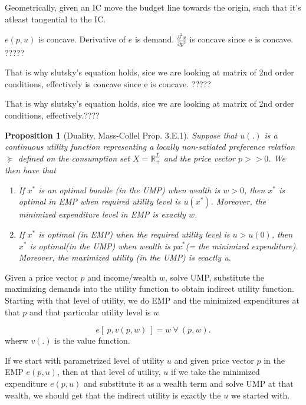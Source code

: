 \documentclass{tufte-handout}
\newtheorem{prop}{Proposition}
\begin{document}
Geometrically, given an IC move the budget line towards the origin, such that it's atleast tangential to the IC.

$e(p,u)$ is concave. Derivative of  $e$ is demand.  $\frac{\partial^2 x}{\partial p^2}$ is concave since e is concave. ?????

That is why slutsky's equation holds, sice we are looking at matrix of 2nd order conditions, effectively is concave since e is concave. ?????

That is why slutsky's equation holds, sice we are looking at matrix of 2nd order conditions, effectively.????






\begin{prop}[Duality, Mass-Collel Prop. 3.E.1]
		Suppose that $u(.)$ is a continuous utility function representing a locally non-satiated preference relation $\succeq$ defined on the consumption set  $X = \mathbb{R}^L_+$ and the price vector  $p >> 0$. We then have that 
		\begin{enumerate}
				\item If $x^*$ is an optimal bundle (in the UMP) when wealth is  $w > 0$, then  $x^*$ is optimal in EMP when required utility level is  $u(x^*)$. Moreover, the minimized expenditure level in EMP is exactly  $w$.
		
				\item If $x^*$ is optimal (in EMP) when the required utility level is  $u > u(0)$, then  $x^*$ is optimal(in the UMP) when wealth is  $px^*$(= the minimized expenditure). Moreover, the maximized utility (in the UMP) is ecactly u.
		\end{enumerate}
		
\end{prop}

\clearpage

Given a price vector $p$ and  income/wealth $w$, solve UMP, substitute the maximizing demands into the utility function to obtain indirect utility function. Starting with that level of utility, we do EMP and the minimized expenditures at that  $p$ and that particular utility level is  $w$

 \[
		 e[ \ p,v(p,w) \ ] = w \ \forall \  (p,w)
.\] 
wherw $v(.)$ is the value function.

If we start with parametrized level of utility  $u$ and given price vector $p$ in the EMP  $e(p,u)$, then at  that level of utility, $u$ if we take the minimized expenditure $e(p,u)$ and substitute it as a wealth term and solve UMP at that wealth, we should get that the indirect utility is exactly the  $u$ we started with.
\end{document}
